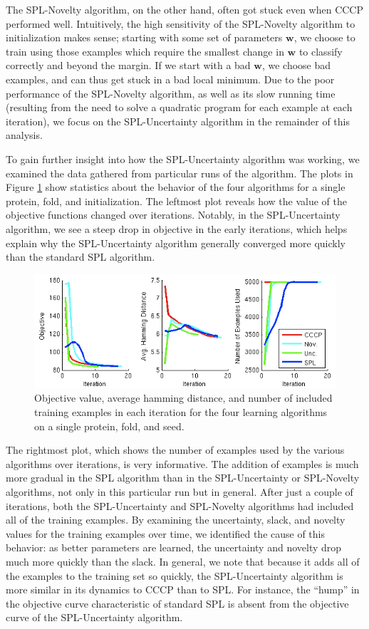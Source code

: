 \documentclass{article}
\begin{document}
The SPL-Novelty algorithm, on the other hand, often got stuck even when CCCP performed well. Intuitively, the high sensitivity of the SPL-Novelty algorithm to initialization makes sense; starting with some set of parameters $\textbf{w}$, we choose to train using those examples which require the smallest change in $\textbf{w}$ to classify correctly and beyond the margin. If we start with a bad $\textbf{w}$, we choose bad examples, and can thus get stuck in a bad local minimum. Due to the poor performance of the SPL-Novelty algorithm, as well as its slow running time (resulting from the need to solve a quadratic program for each example at each iteration), we focus on the SPL-Uncertainty algorithm in the remainder of this analysis.

To gain further insight into how the SPL-Uncertainty algorithm was working, we examined the data gathered  from particular runs of the algorithm. The plots in Figure \ref{fig:exrun} show statistics about the behavior of the four algorithms for a single protein, fold, and initialization. The leftmost plot reveals how the value of the objective functions changed over iterations. Notably, in the SPL-Uncertainty algorithm, we see a steep drop in objective in the early iterations, which helps explain why the SPL-Uncertainty algorithm generally converged more quickly than the standard SPL algorithm. 

\begin{figure}
\includegraphics[scale = 0.7]{ExampleMotifRun_WithNovelty_small2.png}
\caption{Objective value, average hamming distance, and number of included training examples in each iteration for the four learning algorithms on a single protein, fold, and seed.}
\label{fig:exrun}
\end{figure}

The rightmost plot, which shows the number of examples used by the various algorithms over iterations, is very informative. The addition of examples is much more gradual in the SPL algorithm than in the SPL-Uncertainty or SPL-Novelty algorithms, not only in this particular run but in general. After just a couple of iterations, both the SPL-Uncertainty and SPL-Novelty algorithms had included all of the training examples. By examining the uncertainty, slack, and novelty values for the training examples over time, we identified the cause of this behavior: as better parameters are learned, the uncertainty and novelty drop much more quickly than the slack. In general, we note that because it adds all of the examples to the training set so quickly, the SPL-Uncertainty algorithm is more similar in its dynamics to CCCP than to SPL. For instance, the ``hump'' in the objective curve characteristic of standard SPL is absent from the objective curve of the SPL-Uncertainty algorithm. 
\end{document}
